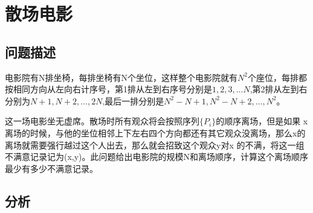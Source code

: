 \section{散场电影}
\subsection{问题描述}

电影院有N排坐椅，每排坐椅有N个坐位，这样整个电影院就有\( N^2\)个座位，每排都按相同方向从左向右计序号，第1排从左到右序号分别是\( 1,2,3,…N\),第2排从左到右分别为\(N+1,N+2,…,2N\),最后一排分别是\(N^2−N+1,N^2−N+2,…,N^2\)。

这一场电影坐无虚席。散场时所有观众将会按照序列\( \{P_i\} \)的顺序离场，但是如果 x离场的时候，与他的坐位相邻上下左右四个方向都还有其它观众没离场，那么x的离场就需要强行越过这个人出去，那么就会招致这个观众y对x 的不满，将这一组不满意记录记为(x,y)。此问题给出电影院的规模N和离场顺序，计算这个离场顺序最少有多少不满意记录。

\subsection{分析}

